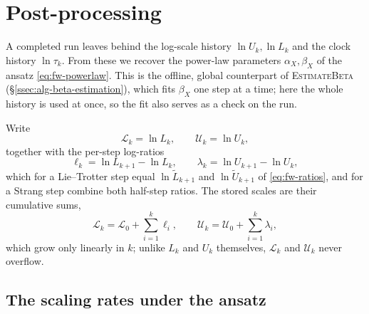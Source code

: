 \section{Post-processing}\label{sec:postproc}

A completed run leaves behind the log-scale history $\ln U_k, \ln L_k$ and the
clock history $\ln \tau_k$. From these we recover the power-law parameters
$\alpha_X, \beta_X$ of the ansatz \eqref{eq:fw-powerlaw}. This is the offline,
global counterpart of \textsc{EstimateBeta} (\S\ref{ssec:alg-beta-estimation}),
which fits $\beta_X$ one step at a time; here the whole history is used at
once, so the fit also serves as a check on the run.

Write
\begin{equation}\label{eq:pp-logs}
  \mathcal{L}_k = \ln L_k, \qquad \mathcal{U}_k = \ln U_k,
\end{equation}
together with the per-step log-ratios
\begin{equation}\label{eq:pp-log-ratios}
  \ell_k = \ln L_{k+1} - \ln L_k, \qquad \lambda_k = \ln U_{k+1} - \ln U_k,
\end{equation}
which for a Lie--Trotter step equal $\ln \tilde{L}_{k+1}$ and
$\ln \tilde{U}_{k+1}$ of \eqref{eq:fw-ratios}, and for a Strang step combine
both half-step ratios. The stored scales are their cumulative sums,
\begin{equation}\label{eq:pp-cumsum}
  \mathcal{L}_k = \mathcal{L}_0 + \sum_{i=1}^{k} \ell_i,
  \qquad
  \mathcal{U}_k = \mathcal{U}_0 + \sum_{i=1}^{k} \lambda_i,
\end{equation}
which grow only linearly in $k$; unlike $L_k$ and $U_k$ themselves,
$\mathcal{L}_k$ and $\mathcal{U}_k$ never overflow.

\subsection{The scaling rates under the ansatz}\label{ssec:pp-rates}

